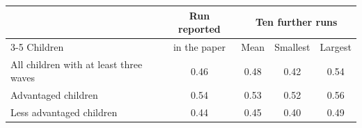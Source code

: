 \begin{tabular}{@{}lcccc@{}}
\toprule
 & Run reported & \multicolumn{3}{c}{Ten further runs} \\
\cmidrule(lr){3-5}
Children & in the paper & Mean & Smallest & Largest \\
\midrule
All children with at least three waves & 0.46 & 0.48 & 0.42 & 0.54 \\
Advantaged children & 0.54 & 0.53 & 0.52 & 0.56 \\
Less advantaged children & 0.44 & 0.45 & 0.40 & 0.49 \\
\bottomrule
\end{tabular}
